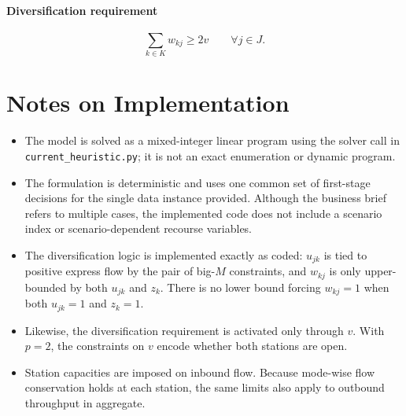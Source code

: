 \paragraph{Diversification requirement}
\[
\sum_{k\in K} w_{kj}\ge 2v
\qquad \forall j\in J .
\]

\section*{Notes on Implementation}

\begin{itemize}
\item The model is solved as a mixed-integer linear program using the solver call in \texttt{current\_heuristic.py}; it is not an exact enumeration or dynamic program.
\item The formulation is deterministic and uses one common set of first-stage decisions for the single data instance provided. Although the business brief refers to multiple cases, the implemented code does not include a scenario index or scenario-dependent recourse variables.
\item The diversification logic is implemented exactly as coded: $u_{jk}$ is tied to positive express flow by the pair of big-$M$ constraints, and $w_{kj}$ is only upper-bounded by both $u_{jk}$ and $z_k$. There is no lower bound forcing $w_{kj}=1$ when both $u_{jk}=1$ and $z_k=1$.
\item Likewise, the diversification requirement is activated only through $v$. With $p=2$, the constraints on $v$ encode whether both stations are open.
\item Station capacities are imposed on inbound flow. Because mode-wise flow conservation holds at each station, the same limits also apply to outbound throughput in aggregate.
\end{itemize}

